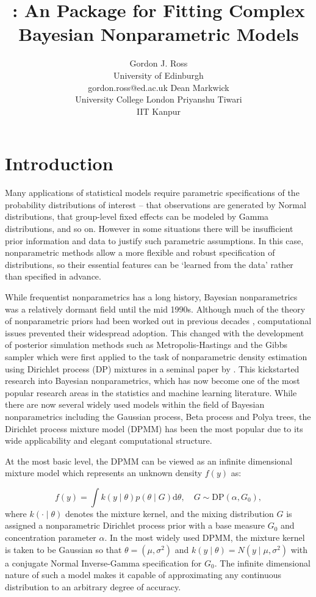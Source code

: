 \documentclass[nojss]{jss}
\author{Gordon J. Ross\\University of Edinburgh\\gordon.ross@ed.ac.uk \And
Dean Markwick\\University College London \And Priyanshu Tiwari \\ IIT Kanpur}
\title{\pkg{dirichletprocess}: An \proglang{R} Package for Fitting Complex Bayesian Nonparametric Models}
\begin{document}



\section[Introduction]{Introduction} \label{sec:intro}

Many applications of statistical models require parametric specifications of the probability distributions of interest -- that observations are generated by Normal distributions, that group-level fixed effects can be modeled by Gamma distributions, and so on. However in some situations there will be insufficient prior information and data to justify such parametric assumptions. In this case, nonparametric methods allow a more flexible and robust specification of distributions, so their  essential features can be `learned from the data' rather than specified in advance.

While frequentist nonparametrics has a long history, Bayesian nonparametrics was a relatively dormant field until the mid 1990s. Although much of the theory of nonparametric priors had been worked out in previous decades \citep{ferguson_bayesian_1973}, computational issues prevented their widespread adoption. This changed with the development of posterior simulation methods such as Metropolis-Hastings \citep{hastings_monte_1970} and the Gibbs sampler \citep{geman_stochastic_1984} which were first applied to the task of nonparametric density estimation using Dirichlet process (DP) mixtures in a seminal paper by \cite{escobar_bayesian_1995}. This kickstarted research into Bayesian nonparametrics, which has now become one of the most popular research areas in the statistics and machine learning literature. While there are now several widely used models within the field of Bayesian nonparametrics including the Gaussian process, Beta process and Polya trees, the Dirichlet process mixture model (DPMM) has been the most popular due to its wide applicability and elegant computational structure.

At the most basic level, the DPMM can be viewed as an infinite dimensional mixture model which represents an unknown density $f(y)$ as:

\begin{equation*}
f(y) = \int k(y \mid \theta) p(\theta \mid G) \mathrm{d} \theta, \quad G \sim \text{DP}(\alpha, G_0),
\end{equation*}
where $k(\cdot \mid \theta)$ denotes the mixture kernel, and the mixing distribution $G$ is assigned a nonparametric Dirichlet process prior with a base measure $G_0$ and concentration parameter $\alpha$. In the most widely used DPMM, the mixture kernel is taken to be Gaussian so that $\theta = (\mu,\sigma^2)$ and $k(y\mid\theta) = N(y\mid \mu,\sigma^2)$ with a conjugate Normal Inverse-Gamma specification for $G_0$. The infinite dimensional nature of such a model makes it capable of approximating any continuous distribution to an arbitrary degree of accuracy.
\end{document}
